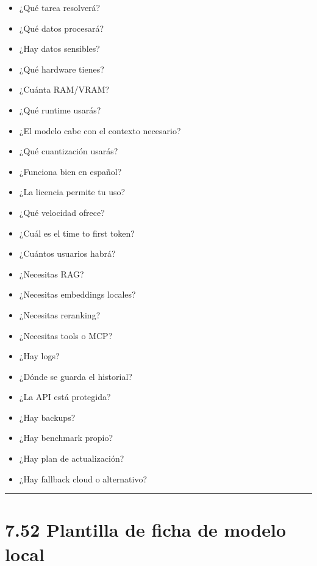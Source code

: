 \begin{itemize}
\tightlist
\item
  ¿Qué tarea resolverá?
\item
  ¿Qué datos procesará?
\item
  ¿Hay datos sensibles?
\item
  ¿Qué hardware tienes?
\item
  ¿Cuánta RAM/VRAM?
\item
  ¿Qué runtime usarás?
\item
  ¿El modelo cabe con el contexto necesario?
\item
  ¿Qué cuantización usarás?
\item
  ¿Funciona bien en español?
\item
  ¿La licencia permite tu uso?
\item
  ¿Qué velocidad ofrece?
\item
  ¿Cuál es el time to first token?
\item
  ¿Cuántos usuarios habrá?
\item
  ¿Necesitas RAG?
\item
  ¿Necesitas embeddings locales?
\item
  ¿Necesitas reranking?
\item
  ¿Necesitas tools o MCP?
\item
  ¿Hay logs?
\item
  ¿Dónde se guarda el historial?
\item
  ¿La API está protegida?
\item
  ¿Hay backups?
\item
  ¿Hay benchmark propio?
\item
  ¿Hay plan de actualización?
\item
  ¿Hay fallback cloud o alternativo?
\end{itemize}

\begin{center}\rule{0.5\linewidth}{0.5pt}\end{center}

\section{7.52 Plantilla de ficha de modelo
local}\label{plantilla-de-ficha-de-modelo-local}

